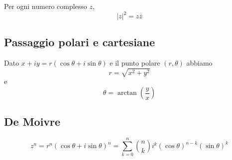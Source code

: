 \documentclass[a4paper]{article}
\begin{document}


Per ogni numero complesso \(z\),
\[
    {|z|}^2 = z\overline{z}
\]

\subsection{Passaggio polari e cartesiane}

Dato \(x+iy = r(\cos\theta + i\sin\theta)\) e il punto polare \((r, \theta)\)
abbiamo
\[
    r = \sqrt{x^2 + y^2}
\]
e \[
    \theta = \arctan\left(\frac{y}{x}\right)
\]

\subsection{De Moivre}

\[
    z^n = r^n {(\cos \theta + i\sin\theta)}^n = \sum_{k=0}^n \binom{n}{k}
    i^k {(\cos\theta)}^{n-k}{(\sin\theta)}^k
\]
\end{document}
